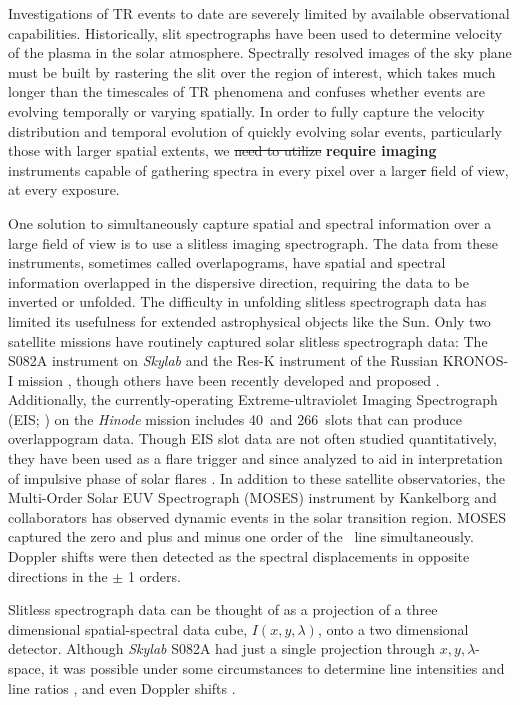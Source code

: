     Investigations of TR events to date are severely limited by available observational capabilities. 
    Historically, slit spectrographs have been used to determine velocity of the plasma in the solar atmosphere.   
    Spectrally resolved images of the sky plane must be built by rastering the slit over the region of interest, which takes much longer than the timescales of TR phenomena and confuses whether events are evolving temporally or varying spatially.  
    In order to fully capture the velocity distribution and temporal evolution of quickly evolving solar events, particularly those with larger spatial extents, we \sout{need to utilize} \textbf{require imaging} instruments capable of gathering spectra in every pixel over a large\sout{r} field of view, at every exposure.
    
    One solution to simultaneously capture spatial and spectral information over a large field of view is to use a slitless imaging spectrograph.  
    The data from these instruments, sometimes called overlapograms, have spatial and spectral information overlapped in the dispersive direction, requiring the data to be inverted or unfolded.
    The difficulty in unfolding slitless spectrograph data has limited its usefulness for extended astrophysical objects like the Sun. 
    Only two satellite missions have routinely captured solar slitless spectrograph data: The S082A instrument on {\it Skylab} \citep{Tousey1973} and the Res-K instrument of the Russian KRONOS-I mission \citep{Zhitnik1998}, though others have been recently developed and proposed \citep{winebarger2019,golub2020}. 
    Additionally, the currently-operating Extreme-ultraviolet Imaging Spectrograph (EIS; \citet{culhane2007}) on the {\it Hinode} mission \citep{kosugi2007} includes 40\arcsec\ and 266\arcsec\ slots that can produce overlappogram data.
    Though EIS slot data are not often studied quantitatively, they have been used as a flare trigger and since analyzed to aid in interpretation of impulsive phase of solar flares \citep{harra2017,harra2020}.
    In addition to these satellite observatories,  the Multi-Order Solar EUV Spectrograph (MOSES) instrument by Kankelborg and collaborators \citep{Kankelborg01,Fox2010,Rust2019} has observed dynamic events in the solar transition region.
    MOSES captured the zero and plus and minus one order of the \heii \ line simultaneously. 
    Doppler shifts were then detected as the spectral displacements in opposite directions in the $\pm$ 1 orders.
    
    Slitless spectrograph data can be thought of as a projection of a three dimensional spatial-spectral data cube, $I(x,y,\lambda)$, onto a two dimensional detector.  
    Although {\it Skylab} S082A had just a single projection through $x,y,\lambda$-space, it was possible under some circumstances to determine line intensities and line ratios \cite[e.g.,][]{Keenan1988, Tayal1989, Keenan2006}, and even Doppler shifts \citep{MariskaDoppler1992}. 

